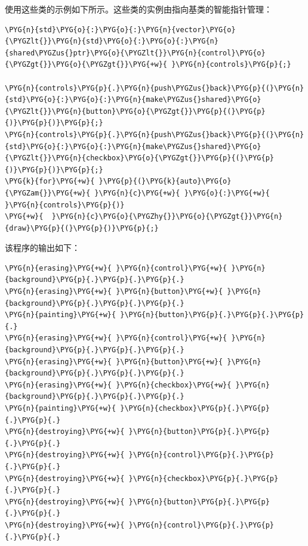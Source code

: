 
使用这些类的示例如下所示。这些类的实例由指向基类的智能指针管理：



\begin{codeblockbg}
\begin{Verbatim}[commandchars=\\\{\},breaklines=true,breakanywhere=true,fontsize=\codefont,xleftmargin=17bp]
\PYG{n}{std}\PYG{o}{:}\PYG{o}{:}\PYG{n}{vector}\PYG{o}{\PYGZlt{}}\PYG{n}{std}\PYG{o}{:}\PYG{o}{:}\PYG{n}{shared\PYGZus{}ptr}\PYG{o}{\PYGZlt{}}\PYG{n}{control}\PYG{o}{\PYGZgt{}}\PYG{o}{\PYGZgt{}}\PYG{+w}{ }\PYG{n}{controls}\PYG{p}{;}

\PYG{n}{controls}\PYG{p}{.}\PYG{n}{push\PYGZus{}back}\PYG{p}{(}\PYG{n}{std}\PYG{o}{:}\PYG{o}{:}\PYG{n}{make\PYGZus{}shared}\PYG{o}{\PYGZlt{}}\PYG{n}{button}\PYG{o}{\PYGZgt{}}\PYG{p}{(}\PYG{p}{)}\PYG{p}{)}\PYG{p}{;}
\PYG{n}{controls}\PYG{p}{.}\PYG{n}{push\PYGZus{}back}\PYG{p}{(}\PYG{n}{std}\PYG{o}{:}\PYG{o}{:}\PYG{n}{make\PYGZus{}shared}\PYG{o}{\PYGZlt{}}\PYG{n}{checkbox}\PYG{o}{\PYGZgt{}}\PYG{p}{(}\PYG{p}{)}\PYG{p}{)}\PYG{p}{;}
\PYG{k}{for}\PYG{+w}{ }\PYG{p}{(}\PYG{k}{auto}\PYG{o}{\PYGZam{}}\PYG{+w}{ }\PYG{n}{c}\PYG{+w}{ }\PYG{o}{:}\PYG{+w}{ }\PYG{n}{controls}\PYG{p}{)}
\PYG{+w}{  }\PYG{n}{c}\PYG{o}{\PYGZhy{}}\PYG{o}{\PYGZgt{}}\PYG{n}{draw}\PYG{p}{(}\PYG{p}{)}\PYG{p}{;}
\end{Verbatim}
\end{codeblockbg}



该程序的输出如下：



\begin{codeblockbg}
\begin{Verbatim}[commandchars=\\\{\},breaklines=true,breakanywhere=true,fontsize=\codefont,xleftmargin=17bp]
\PYG{n}{erasing}\PYG{+w}{ }\PYG{n}{control}\PYG{+w}{ }\PYG{n}{background}\PYG{p}{.}\PYG{p}{.}\PYG{p}{.}
\PYG{n}{erasing}\PYG{+w}{ }\PYG{n}{button}\PYG{+w}{ }\PYG{n}{background}\PYG{p}{.}\PYG{p}{.}\PYG{p}{.}
\PYG{n}{painting}\PYG{+w}{ }\PYG{n}{button}\PYG{p}{.}\PYG{p}{.}\PYG{p}{.}
\PYG{n}{erasing}\PYG{+w}{ }\PYG{n}{control}\PYG{+w}{ }\PYG{n}{background}\PYG{p}{.}\PYG{p}{.}\PYG{p}{.}
\PYG{n}{erasing}\PYG{+w}{ }\PYG{n}{button}\PYG{+w}{ }\PYG{n}{background}\PYG{p}{.}\PYG{p}{.}\PYG{p}{.}
\PYG{n}{erasing}\PYG{+w}{ }\PYG{n}{checkbox}\PYG{+w}{ }\PYG{n}{background}\PYG{p}{.}\PYG{p}{.}\PYG{p}{.}
\PYG{n}{painting}\PYG{+w}{ }\PYG{n}{checkbox}\PYG{p}{.}\PYG{p}{.}\PYG{p}{.}
\PYG{n}{destroying}\PYG{+w}{ }\PYG{n}{button}\PYG{p}{.}\PYG{p}{.}\PYG{p}{.}
\PYG{n}{destroying}\PYG{+w}{ }\PYG{n}{control}\PYG{p}{.}\PYG{p}{.}\PYG{p}{.}
\PYG{n}{destroying}\PYG{+w}{ }\PYG{n}{checkbox}\PYG{p}{.}\PYG{p}{.}\PYG{p}{.}
\PYG{n}{destroying}\PYG{+w}{ }\PYG{n}{button}\PYG{p}{.}\PYG{p}{.}\PYG{p}{.}
\PYG{n}{destroying}\PYG{+w}{ }\PYG{n}{control}\PYG{p}{.}\PYG{p}{.}\PYG{p}{.}
\end{Verbatim}
\end{codeblockbg}


